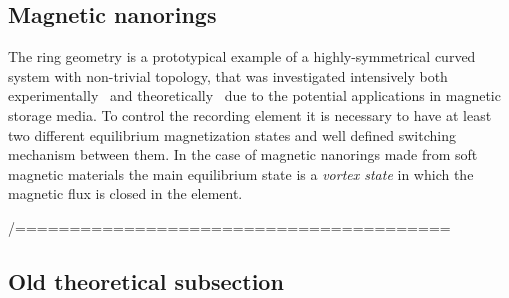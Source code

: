 \subsection{Magnetic nanorings} \label{subsec:Nanorings}

The ring geometry is a prototypical example of a highly-symmetrical curved system with non-trivial topology, that was investigated intensively both experimentally~\cite{Klaui01,Klaui03a,Klaui05a} and theoretically~\cite{Kravchuk09,Kravchuk11} due to the potential applications in magnetic storage media. To control the recording element it is necessary to have at least two different equilibrium magnetization states and well defined switching mechanism between them. In the case of magnetic nanorings made from soft magnetic materials the main equilibrium state is a \textit{vortex state} in which the magnetic flux is closed in the element.


/========================================

\subsection{Old theoretical subsection}

